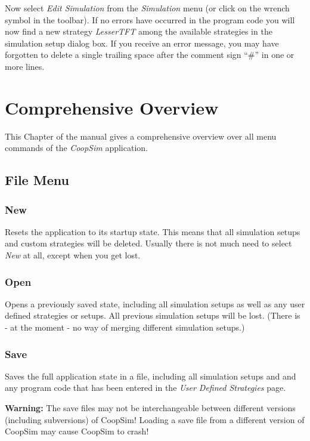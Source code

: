 \documentclass[12pt,a4paper,USenglish]{article}
\begin{document}
Now select \emph{Edit Simulation} from the \emph{Simulation} menu
(or click on the wrench symbol in the toolbar). If no errors have
occurred in the program code you will now find a new strategy \emph{LesserTFT}
among the available strategies in the simulation setup dialog
box. If you receive an error message, you may have forgotten to delete
a single trailing space after the comment sign ``\#'' in one or
more lines.


\section{Comprehensive Overview}

This Chapter of the manual gives a comprehensive overview over all
menu commands of the \emph{CoopSim} application.


\subsection{File Menu}


\subsubsection{New}

Resets the application to its startup state. This means that all simulation
setups and custom strategies will be deleted. Usually there is not
much need to select \emph{New} at all, except when you get lost.


\subsubsection{Open}

Opens a previously saved state, including all simulation setups as
well as any user defined strategies or setups. All previous simulation
setups will be lost. (There is - at the moment - no way of merging
different simulation setups.)


\subsubsection{Save}

Saves the full application state in a file, including all simulation
setups and and any program code that has been entered in the \emph{User
Defined Strategies} page. 

{\bf Warning:} The save files may not be interchangeable between different
versions (including subversions) of CoopSim! Loading a save file from
a different version of CoopSim may cause CoopSim to crash!
\end{document}
